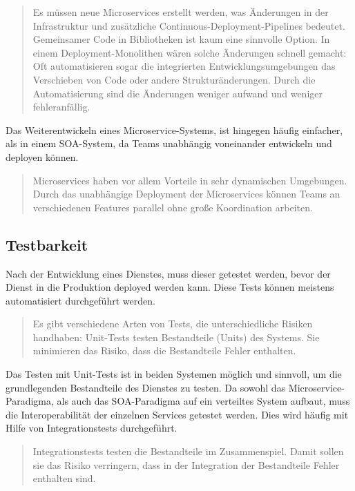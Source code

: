 \begin{quotation}
	\frqq Es müssen neue Microservices erstellt werden, was Änderungen in der Infrastruktur und zusätzliche Continuous-Deployment-Pipelines bedeutet. Gemeinsamer Code in Bibliotheken ist kaum eine sinnvolle Option. In einem Deployment-Monolithen wären solche Änderungen schnell gemacht: Oft automatisieren sogar die integrierten Entwicklungsumgebungen das Verschieben von Code oder andere Strukturänderungen. Durch die Automatisierung sind die Änderungen weniger aufwand und weniger fehleranfällig.\flqq\ \cite[S. 119f]{EWolff2016:Microservices}
\end{quotation}

Das Weiterentwickeln eines Microservice-Systems, ist hingegen häufig einfacher, als in einem SOA-System, da Teams unabhängig voneinander entwickeln und deployen können.

\begin{quotation}
	\frqq Microservices haben vor allem Vorteile in sehr dynamischen Umgebungen. Durch das unabhängige Deployment der Microservices können Teams an verschiedenen Features parallel ohne große Koordination arbeiten.\flqq\ \cite[S. 120]{EWolff2016:Microservices}
\end{quotation}


\subsection{Testbarkeit}
\label{subsec:Testbarkeit}
Nach der Entwicklung eines Dienstes, muss dieser getestet werden, bevor der Dienst in die Produktion deployed werden kann. Diese Tests können meistens automatisiert durchgeführt werden.

\begin{quotation}
	\frqq Es gibt verschiedene Arten von Tests, die unterschiedliche Risiken handhaben: Unit-Tests testen Bestandteile (Units) des Systems. Sie minimieren das Risiko, dass die Bestandteile Fehler enthalten.\flqq\ \cite[S. 219]{EWolff2016:Microservices}
\end{quotation}

Das Testen mit Unit-Tests ist in beiden Systemen möglich und sinnvoll, um die grundlegenden Bestandteile des Dienstes zu testen. Da sowohl das Microservice-Paradigma, als auch das SOA-Paradigma auf ein verteiltes System aufbaut, muss die Interoperabilität der einzelnen Services getestet werden. Dies wird häufig mit Hilfe von Integrationstests durchgeführt.

\begin{quotation}
	\frqq Integrationstests testen die Bestandteile im Zusammenspiel. Damit sollen sie das Risiko verringern, dass in der Integration der Bestandteile Fehler enthalten sind.\flqq\ \cite[S. 220]{EWolff2016:Microservices}
\end{quotation}

